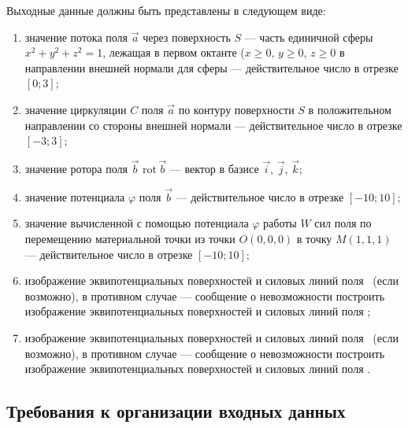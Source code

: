 \documentclass[14pt,a4paper,final]{extreport}
\begin{document}
Выходные данные должны быть представлены в следующем виде:
\begin{enumerate}
	\item значение потока поля \( \vec a \) через поверхность \( S \) --- часть единичной сферы \(x^2 + y^2 + z^2 = 1 \), лежащая в первом октанте (\( x \geq 0 \), \( y \geq 0 \), \( z \geq 0 \) в направлении внешней нормали для сферы --- действительное число в отрезке \( [0; 3] \);

	\item значение циркуляции \( C \) поля \( \vec a \) по контуру поверхности \( S \) в положительном направлении со стороны внешней нормали --- действительное число в отрезке \( [-3; 3] \);

	\item значение ротора поля \( \vec b \) \( \mathrm{rot}\, \vec b \) --- вектор в базисе \( \vec i \), \( \vec j \), \( \vec k \);

	\item значение потенциала \( \varphi \) поля \( \vec b \) --- действительное число в отрезке \( [-10; 10] \);

	\item значение вычисленной с помощью потенциала \( \varphi \) работы \( W \) сил поля по перемещению материальной точки из точки \(O(0,0,0) \) в точку \( M(1,1,1) \) --- действительное число в отрезке \( [-10; 10] \);

\pagebreak %



	\item изображение эквипотенциальных поверхностей и силовых линий поля \fieldA\ (если возможно), в противном случае --- сообщение о невозможности построить изображение эквипотенциальных поверхностей и силовых линий поля \fieldA ;

	\item изображение эквипотенциальных поверхностей и силовых линий поля \fieldB\ (если возможно), в противном случае --- сообщение о невозможности построить изображение эквипотенциальных поверхностей и силовых линий поля \fieldA .
\end{enumerate}



\subsection{Требования к организации входных данных}
\end{document}
